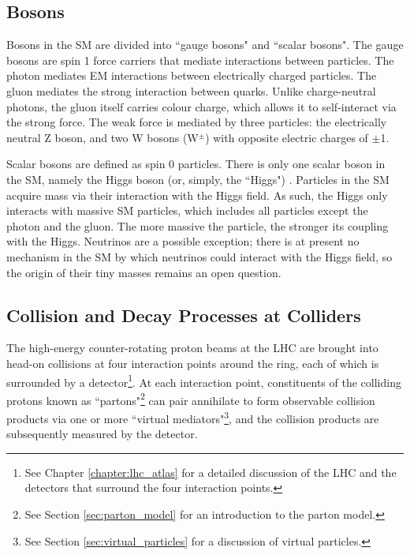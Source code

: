 \subsection{Bosons}

Bosons in the SM are divided into ``gauge bosons" and ``scalar bosons". The gauge bosons are spin 1 force carriers that mediate interactions between particles. The photon mediates EM interactions between electrically charged particles. The gluon mediates the strong interaction between quarks. Unlike charge-neutral photons, the gluon itself carries colour charge, which allows it to self-interact via the strong force. The weak force is mediated by three particles: the electrically neutral Z boson, and two W bosons (W$^\pm$) with opposite electric charges of $\pm$1. 

Scalar bosons are defined as spin 0 particles. There is only one scalar boson in the SM, namely the Higgs boson (or, simply, the ``Higgs") \cite{HiggsTheory1,HiggsTheory2,HiggsTheory3} . Particles in the SM acquire mass via their interaction with the Higgs field. As such, the Higgs only interacts with massive SM particles, which includes all particles except the photon and the gluon. The more massive the particle, the stronger its coupling with the Higgs. Neutrinos are a possible exception; there is at present no mechanism in the SM by which neutrinos could interact with the Higgs field, so the origin of their tiny masses remains an open question.  


\subsection{Collision and Decay Processes at Colliders}
\label{sec:col_decay_procs}

The high-energy counter-rotating proton beams at the LHC are brought into head-on collisions at four interaction points around the ring, each of which is surrounded by a detector\footnote{See Chapter \ref{chapter:lhc_atlas} for a detailed discussion of the LHC and the detectors that surround the four interaction points.}. At each interaction point, constituents of the colliding protons known as ``partons"\footnote{See Section \ref{sec:parton_model} for an introduction to the parton model.} can pair annihilate to form observable collision products via one or more ``virtual mediators"\footnote{See Section \ref{sec:virtual_particles} for a discussion of virtual particles.}, and the collision products are subsequently measured by the detector. 

